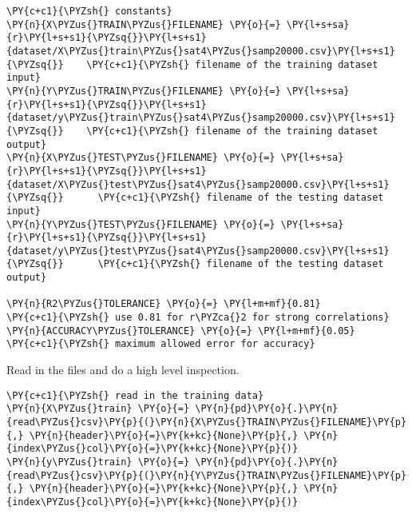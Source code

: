     \begin{tcolorbox}[breakable, size=fbox, boxrule=1pt, pad at break*=1mm,colback=cellbackground, colframe=cellborder]
\begin{Verbatim}[commandchars=\\\{\}]
\PY{c+c1}{\PYZsh{} constants}
\PY{n}{X\PYZus{}TRAIN\PYZus{}FILENAME} \PY{o}{=} \PY{l+s+sa}{r}\PY{l+s+s1}{\PYZsq{}}\PY{l+s+s1}{dataset/X\PYZus{}train\PYZus{}sat4\PYZus{}samp20000.csv}\PY{l+s+s1}{\PYZsq{}}    \PY{c+c1}{\PYZsh{} filename of the training dataset input}
\PY{n}{Y\PYZus{}TRAIN\PYZus{}FILENAME} \PY{o}{=} \PY{l+s+sa}{r}\PY{l+s+s1}{\PYZsq{}}\PY{l+s+s1}{dataset/y\PYZus{}train\PYZus{}sat4\PYZus{}samp20000.csv}\PY{l+s+s1}{\PYZsq{}}    \PY{c+c1}{\PYZsh{} filename of the training dataset output}
\PY{n}{X\PYZus{}TEST\PYZus{}FILENAME} \PY{o}{=} \PY{l+s+sa}{r}\PY{l+s+s1}{\PYZsq{}}\PY{l+s+s1}{dataset/X\PYZus{}test\PYZus{}sat4\PYZus{}samp20000.csv}\PY{l+s+s1}{\PYZsq{}}      \PY{c+c1}{\PYZsh{} filename of the testing dataset input}
\PY{n}{Y\PYZus{}TEST\PYZus{}FILENAME} \PY{o}{=} \PY{l+s+sa}{r}\PY{l+s+s1}{\PYZsq{}}\PY{l+s+s1}{dataset/y\PYZus{}test\PYZus{}sat4\PYZus{}samp20000.csv}\PY{l+s+s1}{\PYZsq{}}      \PY{c+c1}{\PYZsh{} filename of the testing dataset output}

\PY{n}{R2\PYZus{}TOLERANCE} \PY{o}{=} \PY{l+m+mf}{0.81}                                         \PY{c+c1}{\PYZsh{} use 0.81 for r\PYZca{}2 for strong correlations}
\PY{n}{ACCURACY\PYZus{}TOLERANCE} \PY{o}{=} \PY{l+m+mf}{0.05}                                   \PY{c+c1}{\PYZsh{} maximum allowed error for accuracy}
\end{Verbatim}
\end{tcolorbox}

    Read in the files and do a high level inspection.

    \begin{tcolorbox}[breakable, size=fbox, boxrule=1pt, pad at break*=1mm,colback=cellbackground, colframe=cellborder]
\begin{Verbatim}[commandchars=\\\{\}]
\PY{c+c1}{\PYZsh{} read in the training data}
\PY{n}{X\PYZus{}train} \PY{o}{=} \PY{n}{pd}\PY{o}{.}\PY{n}{read\PYZus{}csv}\PY{p}{(}\PY{n}{X\PYZus{}TRAIN\PYZus{}FILENAME}\PY{p}{,} \PY{n}{header}\PY{o}{=}\PY{k+kc}{None}\PY{p}{,} \PY{n}{index\PYZus{}col}\PY{o}{=}\PY{k+kc}{None}\PY{p}{)}
\PY{n}{y\PYZus{}train} \PY{o}{=} \PY{n}{pd}\PY{o}{.}\PY{n}{read\PYZus{}csv}\PY{p}{(}\PY{n}{Y\PYZus{}TRAIN\PYZus{}FILENAME}\PY{p}{,} \PY{n}{header}\PY{o}{=}\PY{k+kc}{None}\PY{p}{,} \PY{n}{index\PYZus{}col}\PY{o}{=}\PY{k+kc}{None}\PY{p}{)}
\end{Verbatim}
\end{tcolorbox}

